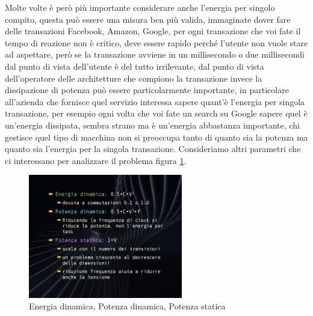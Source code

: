 Molte volte è però più importante considerare anche l'energia per singolo compito, questa può essere una misura ben più valida, immaginate  dover fare delle transazioni Facebook, Amazon, Google, per ogni transazione che voi fate il tempo di reazione non è critico, deve essere rapido perché l'utente non vuole stare ad aspettare, però se la transazione avviene in un millisecondo o due millisecondi dal punto di vista dell'utente è del tutto irrilevante, dal punto di vista dell'operatore delle architetture che compiono la transazione invece la dissipazione di potenza può essere particolarmente importante, in particolare all'azienda che fornisce quel servizio interessa sapere quant'è l'energia per singola transazione, per esempio ogni volta che voi fate un search su Google sapere quel è un'energia dissipata, sembra strano ma è un'energia abbastanza importante, chi gestisce quel tipo di macchina non si preoccupa tanto di quanto sia la potenza ma quanto sia l'energia per la singola transazione.
Consideriamo altri parametri che ci interessano per analizzare il problema figura \ref{fig:Lez02_p01_fig_06}.

\FloatBarrier
\begin{figure}[H]
  \centering
  \includegraphics[width=0.6\textwidth,
                    trim=50 50 45 40, %
                    clip]{images/Lez02_p01_fig_06.png}
  \caption{Energia dinamica, Potenza dinamica, Potenza statica}
  \label{fig:Lez02_p01_fig_06}
\end{figure}
\FloatBarrier
\noindent

